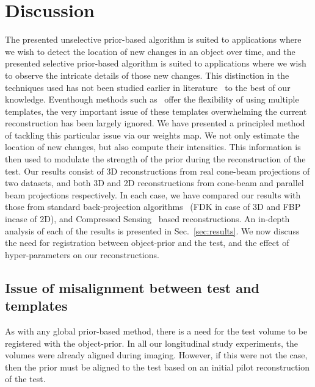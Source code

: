 \documentclass[journal]{IEEEtran}
\begin{document}
\section{Discussion}
\label{sec:discussion}
The presented unselective prior-based algorithm is suited to applications where we wish to detect the location of new changes in an object over time, and the presented selective prior-based algorithm is suited to applications where we wish to observe the intricate details of those new changes. This distinction in the techniques used has not been studied earlier in literature~\cite{geyer2015,PICCS,Ali2018,Tan2017} to the best of our knowledge. Eventhough methods such as~\cite{Hakka2019} offer the flexibility of using multiple templates, the very important issue of these templates overwhelming the current reconstruction has been largely ignored. We have presented a principled method of tackling this particular issue via our weights map. We not only estimate the location of new changes, but also compute their intensities. This information is then used to modulate the strength of the prior during the reconstruction of the test. Our results consist of 3D reconstructions from real cone-beam projections of two datasets, and both 3D and 2D reconstructions from cone-beam and parallel beam projections respectively. In each case, we have compared our results with those from standard back-projection algorithms~\cite{Pan2009} (FDK in case of 3D and FBP incase of 2D), and Compressed Sensing~\cite{Donoho,introCS} based reconstructions. An in-depth analysis of each of the results is presented in Sec.~\ref{sec:results}. We now discuss the need for registration between object-prior and the test, and the effect of hyper-parameters on our reconstructions.

\subsection{Issue of misalignment between test and templates}
As with any global prior-based method, there is a need for the test volume to be registered with the object-prior. In all our longitudinal study experiments, the volumes were already aligned during imaging. However, if this were not the case, then the prior must be aligned to the test based on an initial pilot reconstruction of the test.
\end{document}
